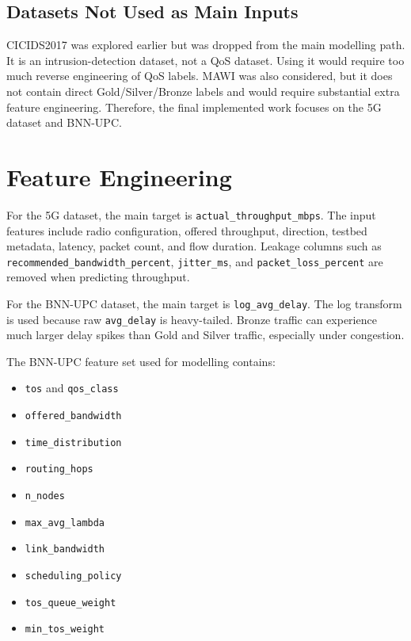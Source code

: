 \documentclass[a4paper,12pt]{Classes/RoboticsLaTeX}
\begin{document}
\subsection{Datasets Not Used as Main Inputs}

CICIDS2017 was explored earlier but was dropped from the main modelling path. It is an intrusion-detection dataset, not a QoS dataset. Using it would require too much reverse engineering of QoS labels. MAWI was also considered, but it does not contain direct Gold/Silver/Bronze labels and would require substantial extra feature engineering. Therefore, the final implemented work focuses on the 5G dataset and BNN-UPC.

\section{Feature Engineering}

For the 5G dataset, the main target is \texttt{actual\_throughput\_mbps}. The input features include radio configuration, offered throughput, direction, testbed metadata, latency, packet count, and flow duration. Leakage columns such as \texttt{recommended\_bandwidth\_percent}, \texttt{jitter\_ms}, and \texttt{packet\_loss\_percent} are removed when predicting throughput.

For the BNN-UPC dataset, the main target is \texttt{log\_avg\_delay}. The log transform is used because raw \texttt{avg\_delay} is heavy-tailed. Bronze traffic can experience much larger delay spikes than Gold and Silver traffic, especially under congestion.

The BNN-UPC feature set used for modelling contains:

\begin{itemize}
    \item \texttt{tos} and \texttt{qos\_class}
    \item \texttt{offered\_bandwidth}
    \item \texttt{time\_distribution}
    \item \texttt{routing\_hops}
    \item \texttt{n\_nodes}
    \item \texttt{max\_avg\_lambda}
    \item \texttt{link\_bandwidth}
    \item \texttt{scheduling\_policy}
    \item \texttt{tos\_queue\_weight}
    \item \texttt{min\_tos\_weight}
\end{itemize}
\end{document}
